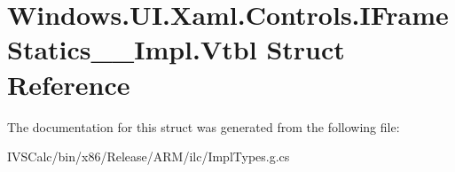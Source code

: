 \hypertarget{struct_windows_1_1_u_i_1_1_xaml_1_1_controls_1_1_i_frame_statics_____impl_1_1_vtbl}{}\section{Windows.\+U\+I.\+Xaml.\+Controls.\+I\+Frame\+Statics\+\_\+\+\_\+\+Impl.\+Vtbl Struct Reference}
\label{struct_windows_1_1_u_i_1_1_xaml_1_1_controls_1_1_i_frame_statics_____impl_1_1_vtbl}


The documentation for this struct was generated from the following file\+:\begin{DoxyCompactItemize}
\item 
I\+V\+S\+Calc/bin/x86/\+Release/\+A\+R\+M/ilc/Impl\+Types.\+g.\+cs\end{DoxyCompactItemize}
